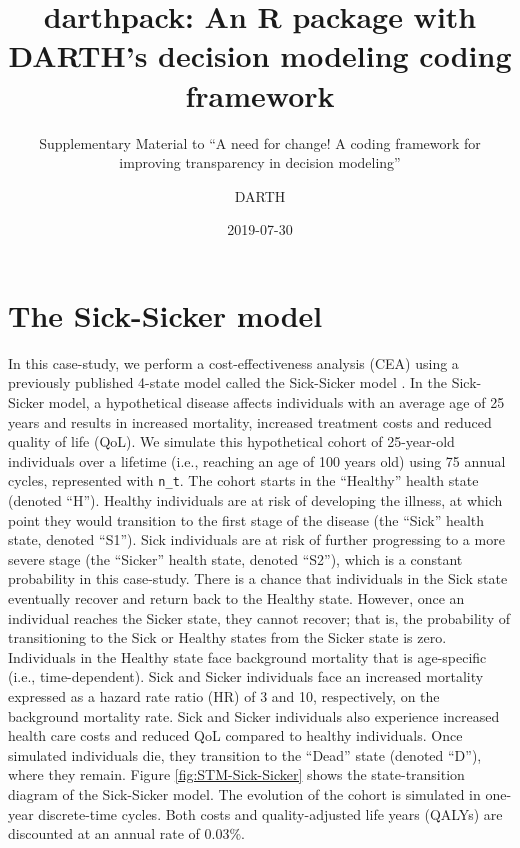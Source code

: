 \documentclass[]{book}
\title{darthpack: An R package with DARTH's decision modeling coding framework}
\subtitle{Supplementary Material to ``A need for change! A coding framework for improving transparency in decision modeling''}
\author{DARTH}
\date{2019-07-30}
\begin{document}
\maketitle

{
\setcounter{tocdepth}{1}
\tableofcontents
}
\hypertarget{the-sick-sicker-model}{%
\chapter*{The Sick-Sicker model}\label{the-sick-sicker-model}}

In this case-study, we perform a cost-effectiveness analysis (CEA) using a previously published 4-state model called the Sick-Sicker model \citep{Enns2015}. In the Sick-Sicker model, a hypothetical disease affects individuals with an average age of 25 years and results in increased mortality, increased treatment costs and reduced quality of life (QoL). We simulate this hypothetical cohort of 25-year-old individuals over a lifetime (i.e., reaching an age of 100 years old) using 75 annual cycles, represented with \texttt{n\_t}. The cohort starts in the ``Healthy'' health state (denoted ``H''). Healthy individuals are at risk of developing the illness, at which point they would transition to the first stage of the disease (the ``Sick'' health state, denoted ``S1''). Sick individuals are at risk of further progressing to a more severe stage (the ``Sicker'' health state, denoted ``S2''), which is a constant probability in this case-study. There is a chance that individuals in the Sick state eventually recover and return back to the Healthy state. However, once an individual reaches the Sicker state, they cannot recover; that is, the probability of transitioning to the Sick or Healthy states from the Sicker state is zero. Individuals in the Healthy state face background mortality that is age-specific (i.e., time-dependent). Sick and Sicker individuals face an increased mortality expressed as a hazard rate ratio (HR) of 3 and 10, respectively, on the background mortality rate. Sick and Sicker individuals also experience increased health care costs and reduced QoL compared to healthy individuals. Once simulated individuals die, they transition to the ``Dead'' state (denoted ``D''), where they remain. Figure \ref{fig:STM-Sick-Sicker} shows the state-transition diagram of the Sick-Sicker model. The evolution of the cohort is simulated in one-year discrete-time cycles. Both costs and quality-adjusted life years (QALYs) are discounted at an annual rate of 0.03\%.
\end{document}
